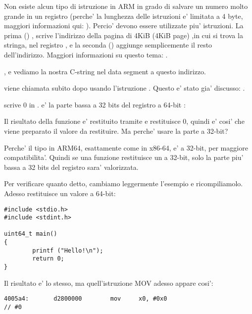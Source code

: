 Non esiste alcun tipo di istruzione in ARM in grado di salvare un numero molto grande in un registro (perche' la lunghezza delle
istruzioni e' limitata a 4 byte, maggiori informazioni qui: ).
Percio' devono essere utilizzate piu' istruzioni. La prima () , scrive l'indirizzo della pagina di 4KiB (4KiB page)
,in cui si trova la stringa, nel registro , e la seconda (\ADD) aggiunge semplicemente il resto dell'indirizzo.
Maggiori informazioni su questo tema: .

, e vediamo la nostra C-string  nel  data segment a questo indirizzo.


\puts viene chiamata subito dopo usando l'istruzione . Questo e' stato gia' discusso: .

\MOV scrive 0 in . 
 e' la parte bassa a 32 bits del registro a 64-bit :



Il risultato della funzione e' restituito tramite  e \main restituisce 0, quindi e' cosi' che viene preparato 
il valore da restituire.
Ma perche' usare la parte a 32-bit?

Perche' il tipo \Tint in ARM64, esattamente come in x86-64, e' a 32-bit, per maggiore compatibilita'.
Quindi se una funzione restituisce un \Tint a 32-bit, solo la parte piu' bassa a 32 bits del registro  sara' valorizzata.

Per verificare quanto detto, cambiamo leggermente l'esempio e ricompiliamolo.
Adesso \main restituisce un valore a 64-bit:

\begin{lstlisting}[caption=\main returning a value of \TT{uint64\_t} type]
#include <stdio.h>
#include <stdint.h>

uint64_t main()
{
        printf ("Hello!\n");
        return 0;
}
\end{lstlisting}

Il risultato e' lo stesso, ma quell'istruzione MOV adesso appare cosi': 

\begin{lstlisting}[caption=\NonOptimizing GCC 4.8.1 + objdump]
  4005a4:       d2800000        mov     x0, #0x0                        // #0
\end{lstlisting}


